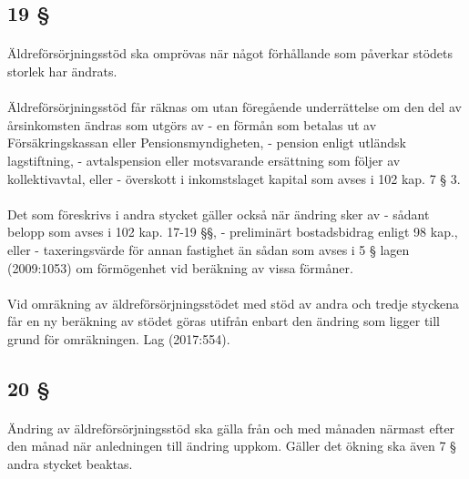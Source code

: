 \documentclass[a4paper,notitlepage,openany,10pt]{book}
\begin{document}
\subsection*{19 §}
\paragraph*{}
Äldreförsörjningsstöd ska omprövas när något förhållande som påverkar stödets storlek har ändrats.
\paragraph*{}
Äldreförsörjningsstöd får räknas om utan föregående underrättelse om den del av årsinkomsten ändras som utgörs av
\newline - en förmån som betalas ut av Försäkringskassan eller Pensionsmyndigheten,
\newline - pension enligt utländsk lagstiftning,
\newline - avtalspension eller motsvarande ersättning som följer av kollektivavtal, eller
\newline - överskott i inkomstslaget kapital som avses i 102 kap. 7 § 3.
\paragraph*{}
Det som föreskrivs i andra stycket gäller också när ändring sker av
\newline - sådant belopp som avses i 102 kap. 17-19 §§,
\newline - preliminärt bostadsbidrag enligt 98 kap., eller
\newline - taxeringsvärde för annan fastighet än sådan som avses i 5 § lagen (2009:1053) om förmögenhet vid beräkning av vissa förmåner.
\paragraph*{}
Vid omräkning av äldreförsörjningsstödet med stöd av andra och tredje styckena får en ny beräkning av stödet göras utifrån enbart den ändring som ligger till grund för omräkningen.
Lag (2017:554).
\subsection*{20 §}
\paragraph*{}
Ändring av äldreförsörjningsstöd ska gälla från och med månaden närmast efter den månad när anledningen till ändring uppkom. Gäller det ökning ska även 7 § andra stycket beaktas.
\end{document}
